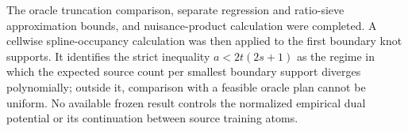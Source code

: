 The oracle truncation comparison, separate regression and ratio-sieve approximation bounds, and nuisance-product calculation were completed. A cellwise spline-occupancy calculation was then applied to the first boundary knot supports. It identifies the strict inequality \(a<2t(2s+1)\) as the regime in which the expected source count per smallest boundary support diverges polynomially; outside it, comparison with a feasible oracle plan cannot be uniform. No available frozen result controls the normalized empirical dual potential or its continuation between source training atoms.